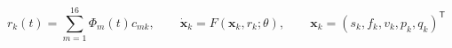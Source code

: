 \documentclass[12pt]{article}
\begin{document}
\fontsize{23}{29}\selectfont\[
r_k(t)=\sum_{m=1}^{16}\Phi_m(t)c_{mk},\qquad \dot{\mathbf x}_k=F(\mathbf x_k,r_k;\theta),\qquad \mathbf x_k=(s_k,f_k,v_k,p_k,q_k)^{\mathsf T}
\]
\end{document}
